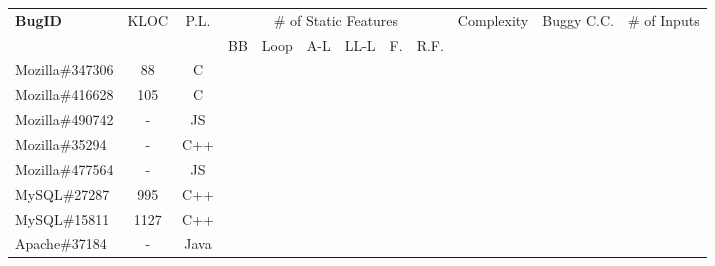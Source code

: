 \begin{table}[h!]
  \centering
  \scriptsize
  \newcommand{\Yes}[1]{\checkmark{}$_#1$}
  \newcommand{\No}[0]{-}
  \begin{tabular}{lccccccccccc}
    \toprule     
    {\bf BugID}                   & KLOC  &  P.L.    & \multicolumn{6}{c}{\# of Static Features}                                          &   Complexity  & Buggy C.C.        & \# of Inputs \\
                           
    \cmidrule(lr){4-9}
                                 &        &          &  BB      &  Loop     & A-L    &  LL-L    &  F.  & R.F.                             &               &                             & \\
    \midrule 

    Mozilla\#347306              &  88    & C        &          &           &       &           &       &                                 &               &&         \\
    Mozilla\#416628              &  105   & C        &          &           &       &           &       &                                 &               &&                \\
    Mozilla\#490742                  &  -  & JS  &  &              &    &                                 &                   &                           &       &&                         \\
    Mozilla\#35294    &  -  & C++  &  &              &    &                                 &                   &                           &                     &&          \\
    Mozilla\#477564   &  -  & JS  &  &              &    &                                 &                   &                           &                      &&          \\
    \midrule
    MySQL\#27287      &  995  & C++  &  &              &    &                                 &                   &                           &                   &&             \\
    MySQL\#15811      &  1127 & C++  &  &              &    &                                 &                   &                           &                   &&             \\
    \midrule
    Apache\#37184     &  -  & Java  &  &              &    &                                 &                   &                           &                    &&           \\ 

\end{tabular}
\end{table}
